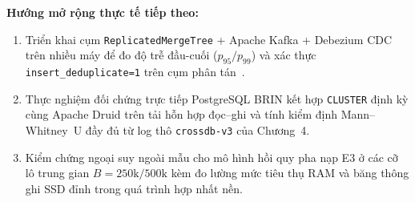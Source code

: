 \documentclass[13pt,a4paper]{report}
\begin{document}
\noindent\textbf{Hướng mở rộng thực tế tiếp theo:}
\begin{enumerate}
    \setlength{\itemsep}{2pt}\setlength{\parskip}{0pt}
    \item Triển khai cụm \texttt{ReplicatedMergeTree} + Apache Kafka + Debezium CDC trên nhiều máy để đo độ trễ đầu-cuối ($p_{95}/p_{99}$) và xác thực \texttt{insert\_\allowbreak{}deduplicate=1} trên cụm phân tán~\cite{S17, V4, P11}.
    \item Thực nghiệm đối chứng trực tiếp PostgreSQL BRIN kết hợp \texttt{CLUSTER} định kỳ cùng Apache Druid trên tải hỗn hợp đọc--ghi và tính kiểm định Mann--Whitney~U đầy đủ từ log thô \texttt{crossdb-v3} của Chương~4.
    \item Kiểm chứng ngoại suy ngoài mẫu cho mô hình hồi quy pha nạp E3 ở các cỡ lô trung gian $B = 250\text{k}/500\text{k}$ kèm đo lường mức tiêu thụ RAM và băng thông ghi SSD đỉnh trong quá trình hợp nhất nền.
\end{enumerate}
\end{document}
